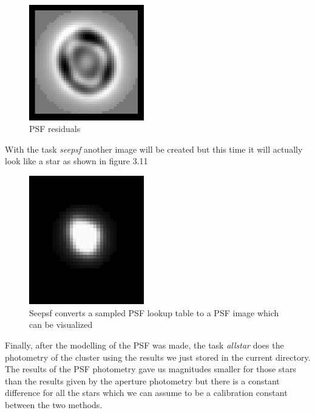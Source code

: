 \begin{figure}[H]
\centering
\includegraphics[width=5cm]{images/psf2.png}
\caption[PSF residuals]{PSF residuals}
\end{figure}

With the task \textit{seepsf} another image will be created but this time it will actually look like a star as shown in figure 3.11

\begin{figure}[H]
\centering
\includegraphics[width=5cm]{images/psf3.png}
\caption[PSF image created by the task Seepsf]{Seepsf converts a sampled PSF lookup table to a PSF image which can be visualized}
\end{figure}

Finally, after the modelling of the PSF was made, the task \textit{allstar} does the photometry of the cluster using the results we just stored in the current directory. The results of the PSF photometry gave us magnitudes smaller for those stars than the results given by the aperture photometry but there is a constant difference for all the stars which we can assume to be a calibration constant between the two methods.

